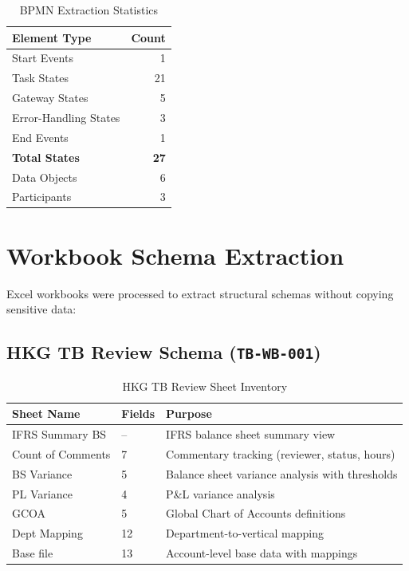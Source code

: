\documentclass[11pt,a4paper,twoside]{report}
\newcommand{\srcref}[1]{\texttt{#1}}
\begin{document}
\begin{table}[h]
\centering
\caption{BPMN Extraction Statistics}
\label{tab:bpmn-statistics}
\begin{tabular}{@{}lr@{}}
\toprule
\textbf{Element Type} & \textbf{Count} \\
\midrule
Start Events & 1 \\
Task States & 21 \\
Gateway States & 5 \\
Error-Handling States & 3 \\
End Events & 1 \\
\midrule
\textbf{Total States} & \textbf{27} \\
\midrule
Data Objects & 6 \\
Participants & 3 \\
\bottomrule
\end{tabular}
\end{table}

\section{Workbook Schema Extraction}
\label{sec:workbook-schema}

Excel workbooks were processed to extract structural schemas without
copying sensitive data:

\subsection{HKG TB Review Schema (\srcref{TB-WB-001})}

\begin{table}[h]
\centering
\caption{HKG TB Review Sheet Inventory}
\label{tab:hkg-tb-sheets}
\begin{tabularx}{\textwidth}{@{}L{4cm}C{2cm}L{7.5cm}@{}}
\toprule
\textbf{Sheet Name} & \textbf{Fields} & \textbf{Purpose} \\
\midrule
IFRS Summary BS & -- & IFRS balance sheet summary view \\
Count of Comments & 7 & Commentary tracking (reviewer, status, hours) \\
BS Variance & 5 & Balance sheet variance analysis with thresholds \\
PL Variance & 4 & P\&L variance analysis \\
GCOA & 5 & Global Chart of Accounts definitions \\
Dept Mapping & 12 & Department-to-vertical mapping \\
Base file & 13 & Account-level base data with mappings \\
\bottomrule
\end{tabularx}
\end{table}
\end{document}
